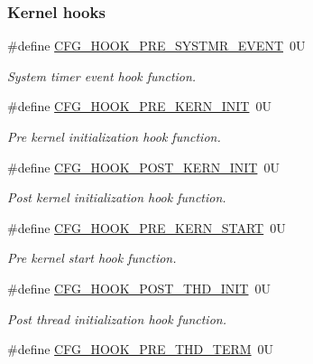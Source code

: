 \subsubsection*{Kernel hooks}
\begin{DoxyCompactItemize}
\item 
\#define \hyperlink{group__template__kern__cfg_gaa130bc9f72010b44b4b06618d8f8d0bc}{C\-F\-G\-\_\-\-H\-O\-O\-K\-\_\-\-P\-R\-E\-\_\-\-S\-Y\-S\-T\-M\-R\-\_\-\-E\-V\-E\-N\-T}~0\-U
\begin{DoxyCompactList}\small\item\em System timer event hook function. \end{DoxyCompactList}\item 
\#define \hyperlink{group__template__kern__cfg_ga4093113f2105d2716f86c6509a6e643a}{C\-F\-G\-\_\-\-H\-O\-O\-K\-\_\-\-P\-R\-E\-\_\-\-K\-E\-R\-N\-\_\-\-I\-N\-I\-T}~0\-U
\begin{DoxyCompactList}\small\item\em Pre kernel initialization hook function. \end{DoxyCompactList}\item 
\#define \hyperlink{group__template__kern__cfg_ga85dea823714335c2ec9e9f7750996e83}{C\-F\-G\-\_\-\-H\-O\-O\-K\-\_\-\-P\-O\-S\-T\-\_\-\-K\-E\-R\-N\-\_\-\-I\-N\-I\-T}~0\-U
\begin{DoxyCompactList}\small\item\em Post kernel initialization hook function. \end{DoxyCompactList}\item 
\#define \hyperlink{group__template__kern__cfg_gad67d998118375811b0f3e63543311661}{C\-F\-G\-\_\-\-H\-O\-O\-K\-\_\-\-P\-R\-E\-\_\-\-K\-E\-R\-N\-\_\-\-S\-T\-A\-R\-T}~0\-U
\begin{DoxyCompactList}\small\item\em Pre kernel start hook function. \end{DoxyCompactList}\item 
\#define \hyperlink{group__template__kern__cfg_ga23deae306171d1a8dda4d0e33efdb6bb}{C\-F\-G\-\_\-\-H\-O\-O\-K\-\_\-\-P\-O\-S\-T\-\_\-\-T\-H\-D\-\_\-\-I\-N\-I\-T}~0\-U
\begin{DoxyCompactList}\small\item\em Post thread initialization hook function. \end{DoxyCompactList}\item 
\#define \hyperlink{group__template__kern__cfg_ga9c7dd4e009a89e9cffb0f9b404bc6250}{C\-F\-G\-\_\-\-H\-O\-O\-K\-\_\-\-P\-R\-E\-\_\-\-T\-H\-D\-\_\-\-T\-E\-R\-M}~0\-U

\end{DoxyCompactItemize}
